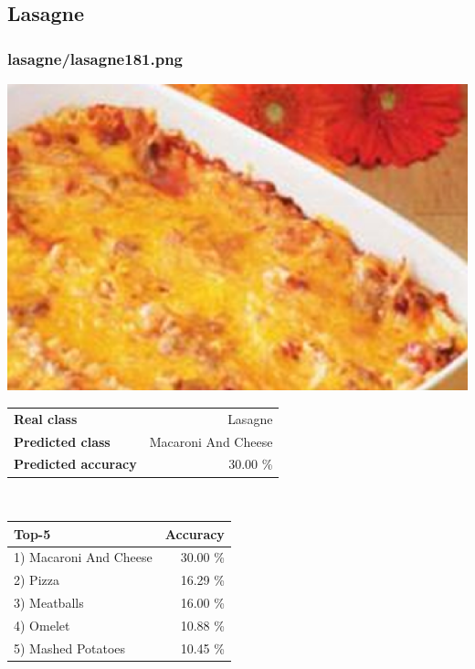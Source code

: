 \subsection{Lasagne}
    
\subsubsection{lasagne/lasagne181.png}

\begin{minipage}[t]{0.4\textwidth}
	\vspace{0pt}
	\includegraphics[width=\linewidth]{images/evaluation-images/lasagne/lasagne181.png}
\end{minipage}
\hfill
\begin{minipage}[t]{0.5\textwidth}
	\vspace{0pt}\raggedright
	\begin{tabularx}{\textwidth}{X r}
		\small \textbf{Real class} & \small Lasagne\\
		\small \textbf{Predicted class} & \small Macaroni And Cheese\\
		\small \textbf{Predicted accuracy} & \small 30.00 \%
    \end{tabularx}\\
    
    \vspace{6pt}
	\begin{tabularx}{\textwidth}{X r}
        \small \textbf{Top-5} & \small \textbf{Accuracy} \\
        \hline
		\small 1) Macaroni And Cheese & \small 30.00 \%\\\small 2) Pizza & \small 16.29 \%\\\small 3) Meatballs & \small 16.00 \%\\\small 4) Omelet & \small 10.88 \%\\\small 5) Mashed Potatoes & \small 10.45 \%
    \end{tabularx}
\end{minipage}
    
